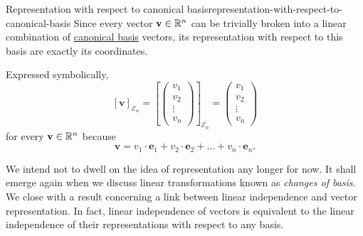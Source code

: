 \begin{example}{Representation with respect to canonical basis}{representation-with-respect-to-canonical-basis}
 Since every vector $\mathbf{v} \in \mathbb{R}^{n}$ can be trivially broken into a
 linear combination of \hyperref[def:standard-basis]{canonical basis} vectors,
 its representation with respect to this basis are exactly its coordinates.

 Expressed symbolically,
 \[
  [\mathbf{v}]_{\mathcal{E}_n} = 
  \left[ 
  \begin{pmatrix}
   v_1\\
   v_2\\
   \vdots\\
   v_n
  \end{pmatrix}
  \right]_{\mathcal{E}_n} = 
  \begin{pmatrix}
   v_1\\
   v_2\\
   \vdots\\
   v_n
  \end{pmatrix}
 \]
 for every $\mathbf{v} \in \mathbb{R}^{n}$ because
 \[
  \mathbf{v} = v_1 \cdot \mathbf{e}_1 + v_2 \cdot \mathbf{e}_2 + \ldots + v_n
  \cdot \mathbf{e}_n.
 \]
\end{example}

We intend not to dwell on the idea of representation any longer for now. It
shall emerge again when we discuss linear transformations known as \emph{changes
of basis}. We close with a result concerning a link between linear independence
and vector representation. In fact, linear independence of vectors is equivalent
to the linear independence of their representations with respect to any basis.


